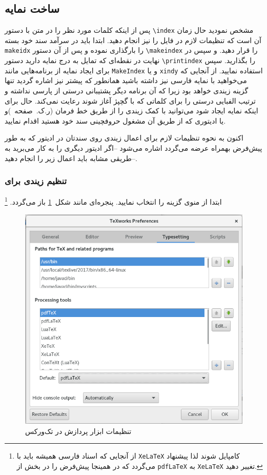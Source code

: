 {{{    \subsection{ساخت نمایه}
    پس از اینکه کلمات مورد نظر را در متن با دستور \Verb+\index+ مشخص نمودید حال زمان آن است که تنظیمات لازم در فایل را نیز انجام دهید. 
    ابتدا باید در سرآمد سند خود بسته \Verb+makeidx+ را بارگذاری نموده و پس از آن دستور \Verb+\makeindex+ را قرار دهید. 
    و سپس در نهایت در نقطه‌ای که تمایل به درج نمایه دارید دستور \Verb+\printindex+ را بگذارید. سپس برای ایجاد نمایه از برنامه‌هایی مانند 
    \Verb+MakeIndex+ و یا \Verb+xindy+ 
    استفاده نمایید. از آنجایی که می‌خواهید با نمایه فارسی نیز داشته باشید همانطور که پیشتر نیز اشاره گردید تنها گزینه زیندی خواهد بود زیرا که آن برنامه 
    دیگر پشتیبانی درستی از پارسی نداشته و ترتیب الفبایی درستی را برای کلماتی که با گچپژ آغاز شوند رعایت نمی‌کند. حال برای اینکه نمایه ایجاد شود 
    می‌توانید با کمک زیندی را از طریق خط فرمان (ر.ک.~صفحه~\pageref{xindy})و یا ادیتوری که از طریق آن مشغول حروفچینی سند خود هستید اقدام نمایید.
    
    اکنون به نحوه تنظیمات لازم برای اعمال زیندی روی سندتان در ادیتور  که به طور پیش‌فرض بهمراه 
    عرضه می‌گردد اشاره می‌شود --اگر ادیتور دیگری را به کار می‌برید به طریقی مشابه باید اعمال زیر را انجام دهید--. 


    \subsubsection{تنظیم زیندی برای }
    ابتدا از منوی  گزینه  را انتخاب نمایید. پنجره‌ای مانند شکل~\ref{fig:texworks_preferences} باز می‌گردد.%
    \footnote{از آنجایی که اسناد فارسی
    همیشه باید با \Verb+XeLaTeX+ کامپایل شوند لذا پیشنهاد می‌گردد که در همینجا پیش‌فرض را در بخش  
    از \Verb+pdfLaTeX+  به \Verb+XeLaTeX+ تغییر دهید.} 
    
    \begin{figure}[h]
    \centering
    \includegraphics[width=.8\textwidth]{texworks_preferences}
    \caption{تنظیمات ابزار پردازش در تک‌ورکس}
    \label{fig:texworks_preferences}
    \end{figure}
    
}}}
